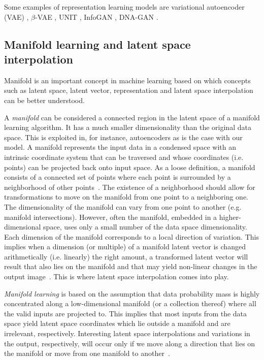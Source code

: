 \documentclass[12pt,a4paper]{article}
\begin{document}
Some examples of representation learning models are variational autoencoder (VAE) \cite{VAE}, $\beta$-VAE \cite{betaVAE}, UNIT \cite{UNIT}, InfoGAN \cite{InfoGAN}, DNA-GAN \cite{DnaGan}.



\subsection{Manifold learning and latent space interpolation}
Manifold is an important concept in machine learning based on which concepts such as latent space, latent vector, representation and latent space interpolation can be better understood. 

A \textit{manifold} can be considered a connected region in the latent space of a manifold learning algorithm. It has a much smaller dimensionality than the original data space. This is exploited in, for instance, autoencoders as is the case with our model. A manifold represents the input data in a condensed space with an intrinsic coordinate system that can be traversed and whose coordinates (i.e. points) can be projected back onto input space. As a loose definition, a manifold consists of a connected set of points where each point is surrounded by a neighborhood of other points~\cite{DeepLearningBook}. The existence of a neighborhood should allow for transformations to move on the manifold from one point to a neighboring one. The dimensionality of the manifold can vary from one point to another (e.g. manifold intersections). However, often the manifold, embedded in a higher-dimensional space, uses only a small number of the data space dimensionality. Each dimension of the manifold corresponds to a local direction of variation. This implies when a dimension (or multiple) of a manifold latent vector is changed arithmetically (i.e. linearly) the right amount, a transformed latent vector will result that also lies on the manifold and that may yield non-linear changes in the output image~\cite{StyleGAN}. This is where latent space interpolation comes into play. 

\textit{Manifold learning} is based on the assumption that data probability mass is highly concentrated along a low-dimensional manifold (or a collection thereof) where all the valid inputs are projected to. This implies that most inputs from the data space yield latent space coordinates which lie outside a manifold and are irrelevant, respectively. Interesting latent space interpolations and variations in the output, respectively, will occur only if we move along a direction that lies on the manifold or move from one manifold to another~\cite{DeepLearningBook}.
\end{document}
